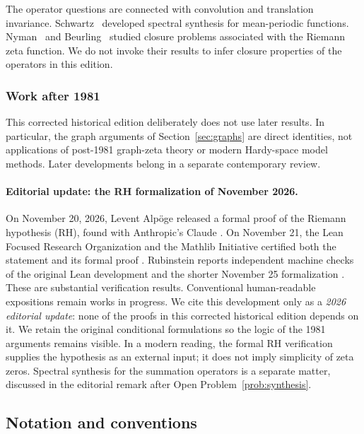 \documentclass[12pt,letterpaper]{article}
\theoremstyle{definition}
\theoremstyle{remark}
\numberwithin{equation}{section}
\begin{document}
The operator questions are connected with convolution and translation
invariance.  Schwartz~\cite{Sc47} developed spectral synthesis for
mean-periodic functions.  Nyman~\cite{Ny50} and
Beurling~\cite{Be55} studied closure problems associated with the
Riemann zeta function.  We do not invoke their results to infer
closure properties of the operators in this edition.

\subsubsection*{Work after 1981}

This corrected historical edition deliberately does not use later
results.  In particular, the graph arguments of Section~\ref{sec:graphs}
are direct identities, not applications of post-1981 graph-zeta theory
or modern Hardy-space model methods.  Later developments belong in a
separate contemporary review.

\paragraph{Editorial update: the RH formalization of November 2026.}
On November 20, 2026, Levent Alp\"oge released a formal proof of the
Riemann hypothesis (RH), found with Anthropic's Claude \cite{Ru26}. On November 21, the
Lean Focused Research Organization and the Mathlib Initiative
certified both the statement and its formal proof \cite{LF26}.
Rubinstein reports independent machine checks of the original Lean
development and the shorter November 25 formalization \cite{Ru26}.
These are substantial verification results. Conventional human-readable
expositions remain works in progress. We cite this development only as a
\emph{2026 editorial update}: none of the proofs in this corrected
historical edition depends on it. We retain the original conditional
formulations so the logic of the 1981 arguments remains visible. In a
modern reading, the formal RH verification supplies the hypothesis as an
external input; it does not imply simplicity of zeta zeros.  Spectral
synthesis for the summation operators is a separate matter, discussed in
the editorial remark after Open Problem~\ref{prob:synthesis}.


\subsection{Notation and conventions}\label{sec:notation}
\end{document}
